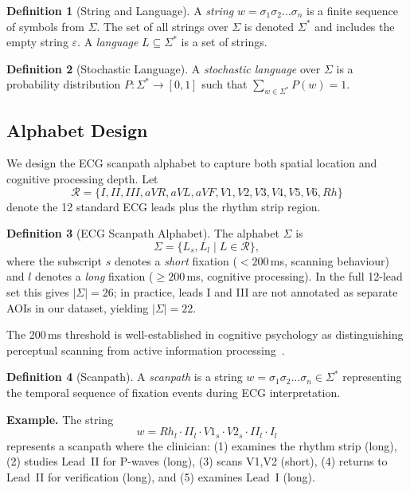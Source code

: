 \documentclass[sigconf]{acmart}
\theoremstyle{plain}
\theoremstyle{definition}
\newtheorem{definition}{Definition}
\begin{document}
\begin{definition}[String and Language]
A \emph{string} $w = \sigma_1\sigma_2\ldots\sigma_n$ is a finite sequence of symbols from $\Sigma$.
The set of all strings over $\Sigma$ is denoted $\Sigma^*$ and includes the empty string $\varepsilon$.
A \emph{language} $L \subseteq \Sigma^*$ is a set of strings.
\end{definition}

\begin{definition}[Stochastic Language]
A \emph{stochastic language} over $\Sigma$ is a probability distribution $P: \Sigma^* \rightarrow [0,1]$ such that $\sum_{w \in \Sigma^*} P(w) = 1$.
\end{definition}

\subsection{Alphabet Design}

We design the ECG scanpath alphabet to capture both spatial location and cognitive processing depth.
Let
\[
\mathcal{R} = \{I, II, III, aVR, aVL, aVF, V1, V2, V3, V4, V5, V6, Rh\}
\]
denote the 12 standard ECG leads plus the rhythm strip region.

\begin{definition}[ECG Scanpath Alphabet]
The alphabet $\Sigma$ is
\begin{equation}
\Sigma = \{ L_s, L_l \mid L \in \mathcal{R} \},
\end{equation}
where the subscript $s$ denotes a \emph{short} fixation ($<200$\,ms, scanning behaviour) and $l$ denotes a \emph{long} fixation ($\geq 200$\,ms, cognitive processing).
In the full 12-lead set this gives $|\Sigma| = 26$; in practice, leads I and III are not annotated as separate AOIs in our dataset, yielding $|\Sigma| = 22$.
\end{definition}

The 200\,ms threshold is well-established in cognitive psychology as distinguishing perceptual scanning from active information processing~\cite{kundel1978}.

\begin{definition}[Scanpath]
A \emph{scanpath} is a string $w = \sigma_1\sigma_2\ldots\sigma_n \in \Sigma^*$ representing the temporal sequence of fixation events during ECG interpretation.
\end{definition}

\textbf{Example.}
The string
\[
w = Rh_l \cdot II_l \cdot V1_s \cdot V2_s \cdot II_l \cdot I_l
\]
represents a scanpath where the clinician:
(1) examines the rhythm strip (long),
(2) studies Lead~II for P-waves (long),
(3) scans V1,V2 (short),
(4) returns to Lead~II for verification (long), and
(5) examines Lead~I (long).
\end{document}
